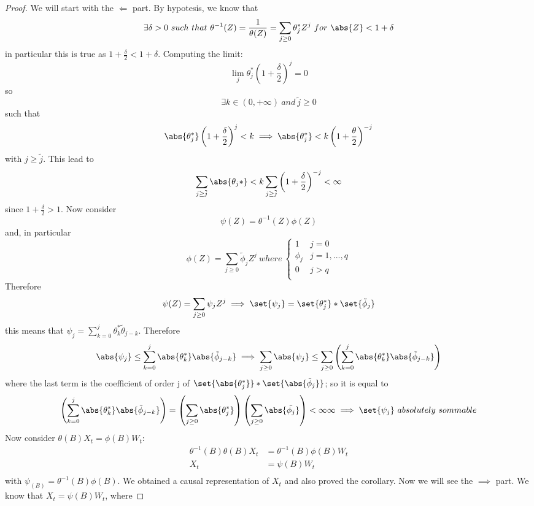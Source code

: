 \begin{proof}
    We will start with the $\Leftarrow$ part. By hypotesis, we know that
    \[
        \exists\delta>0\ such\ that\ \theta^{-1}(Z)=\frac{1}{\theta(Z)}=\sum_{j\ge0}\theta_j^*Z^j\ for\ \abs{Z}<1+\delta  
    \]
    in particular this is true as $1+\frac{\delta}{2}<1+\delta$. Computing the limit:
    \[
        \lim_j\theta_j^*(1+\frac{\delta}{2})^j=0  
    \]
    so
    \[
        \exists k\in(0,+\infty)\ and\ \tilde{j}\ge0  
    \]
    such that
    \[
        \abs{\theta_j^*}\left(1+\frac{\delta}{2}\right)^j<k\implies\abs{\theta_j^*}<k\left(1+\frac{\theta}{2}\right)^{-j}  
    \]
    with $j\ge\tilde{j}$. This lead to
    \[
        \sum_{j\ge\tilde{j}}\abs{\theta_j*}<k\sum_{j\ge\tilde{j}}\left(1+\frac{\delta}{2}\right)^{-j}<\infty
    \]
    since $1+\frac{\delta}{2}>1$. Now consider
    \[
        \psi(Z)=\theta^{-1}(Z)\phi(Z)  
    \]
    and, in particular
    \[
        \phi(Z)=\sum_{j\ge0}\tilde{\phi}_jZ^j\ where\ 
        \begin{cases}
            1&j=0\\
            \phi_j&j=1,...,q\\
            0&j>q\\
        \end{cases}
    \]
    Therefore
    \[
        \psi(Z)=\sum_{j\ge0}\psi_jZ^j\implies\set{\psi_j}=\set{\theta_j^*}*\set{\tilde{\phi}_j}
    \]
    this means that $\psi_j=\sum_{k=0}^j\theta_k^*\tilde{\theta}_{j-k}$. Therefore
    \[
        \abs{\psi_j}\le\sum_{k=0}^j\abs{\theta_k^*}\abs{\tilde{\phi}_{j-k}}\implies\sum_{j\ge0}\abs{\psi_j}\le\sum_{j\ge0}\left(\sum_{k=0}^j\abs{\theta_k^*}\abs{\tilde{\phi}_{j-k}}\right) 
    \]
    where the last term is the coefficient of order j of $\set{\abs{\theta_j^*}}*\set{\abs{\tilde{\phi}_j}}$; so it is equal to
    \[
        \left(\sum_{k=0}^j\abs{\theta_k^*}\abs{\tilde{\phi}_{j-k}}\right)=\left(\sum_{j\ge0}\abs{\theta_j^*}\right)\left(\sum_{j\ge0}\abs{\tilde{\phi_j}}\right)<\infty\infty\implies\set{\psi_j}\ absolutely\ sommable
    \]
    Now consider $\theta(B)X_t=\phi(B)W_t$:
    \begin{equation*}
        \begin{split}
            \theta^{-1}(B)\theta(B)X_t&=\theta^{-1}(B)\phi(B)W_t\\
            X_t&=\psi(B)W_t\\
        \end{split}
    \end{equation*}
    with $\psi_(B)=\theta^{-1}(B)\phi(B)$. We obtained a causal representation of $X_t$ and also proved the corollary. Now we will see the $\implies$ part. We know that $X_t=\psi(B)W_t$, where

\end{proof}
